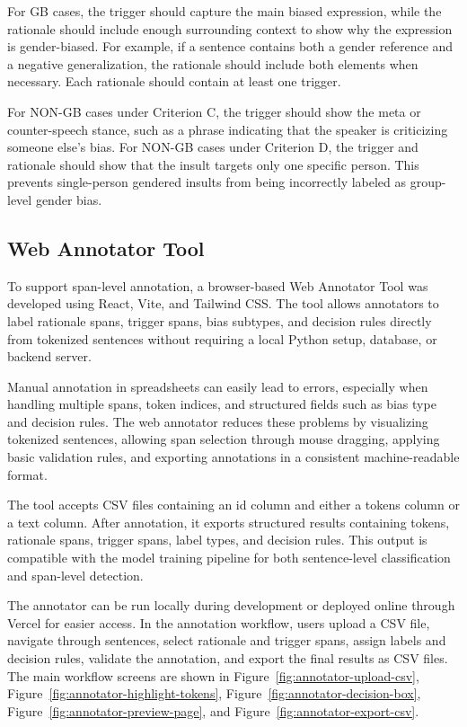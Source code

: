 \documentclass[12pt,oneside,openright,a4paper]{cpe-english-project}
\begin{document}
For GB cases, the trigger should capture the main biased expression, while the rationale should include enough surrounding context to show why the expression is gender-biased. For example, if a sentence contains both a gender reference and a negative generalization, the rationale should include both elements when necessary. Each rationale should contain at least one trigger.

For NON-GB cases under Criterion C, the trigger should show the meta or counter-speech stance, such as a phrase indicating that the speaker is criticizing someone else's bias. For NON-GB cases under Criterion D, the trigger and rationale should show that the insult targets only one specific person. This prevents single-person gendered insults from being incorrectly labeled as group-level gender bias.

\subsection{Web Annotator Tool}

To support span-level annotation, a browser-based Web Annotator Tool was developed using React, Vite, and Tailwind CSS. The tool allows annotators to label rationale spans, trigger spans, bias subtypes, and decision rules directly from tokenized sentences without requiring a local Python setup, database, or backend server.

Manual annotation in spreadsheets can easily lead to errors, especially when handling multiple spans, token indices, and structured fields such as bias type and decision rules. The web annotator reduces these problems by visualizing tokenized sentences, allowing span selection through mouse dragging, applying basic validation rules, and exporting annotations in a consistent machine-readable format.

The tool accepts CSV files containing an id column and either a tokens column or a text column. After annotation, it exports structured results containing tokens, rationale spans, trigger spans, label types, and decision rules. This output is compatible with the model training pipeline for both sentence-level classification and span-level detection.

The annotator can be run locally during development or deployed online through Vercel for easier access. In the annotation workflow, users upload a CSV file, navigate through sentences, select rationale and trigger spans, assign labels and decision rules, validate the annotation, and export the final results as CSV files. The main workflow screens are shown in Figure~\ref{fig:annotator-upload-csv}, Figure~\ref{fig:annotator-highlight-tokens}, Figure~\ref{fig:annotator-decision-box}, Figure~\ref{fig:annotator-preview-page}, and Figure~\ref{fig:annotator-export-csv}.
\end{document}

